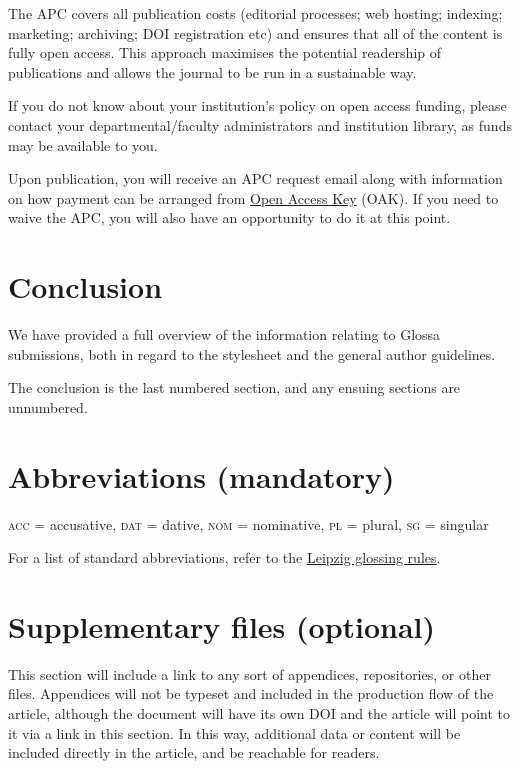 \documentclass[charis,linguex]{glossa}
\begin{document}
The APC covers all publication costs (editorial processes; web hosting; indexing; marketing; archiving; DOI registration etc) and ensures that all of the content is fully open access. This approach maximises the potential readership of publications and allows the journal to be run in a sustainable way.

If you do not know about your institution’s policy on open access funding, please contact your departmental/faculty administrators and institution library, as funds may be available to you.

Upon publication, you will receive an APC request email along with information on how payment can be arranged from \href{https://www.openaccesskey.com}{Open Access Key} (OAK). If you need to waive the APC, you will also have an opportunity to do it at this point.

\section{Conclusion}

We have provided a full overview of the information relating to Glossa submissions, both in regard to the stylesheet and the general author guidelines. 

The conclusion is the last numbered section, and any ensuing sections are unnumbered.

\section*{Abbreviations (mandatory)}

\textsc{acc} = accusative, \textsc{dat} = dative, \textsc{nom} = nominative, \textsc{pl} = plural, \textsc{sg} = singular

For a list of standard abbreviations, refer to the \href{https://www.eva.mpg.de/lingua/resources/glossing-rules.php}{Leipzig glossing rules}. 

\section*{Supplementary files (optional)}

This section will include a link to any sort of appendices, repositories, or other files. Appendices will not be typeset and included in the production flow of the article, although the document will have its own DOI and the article will point to it via a link in this section. In this way, additional data or content will be included directly in the article, and  be reachable for readers.
\end{document}
